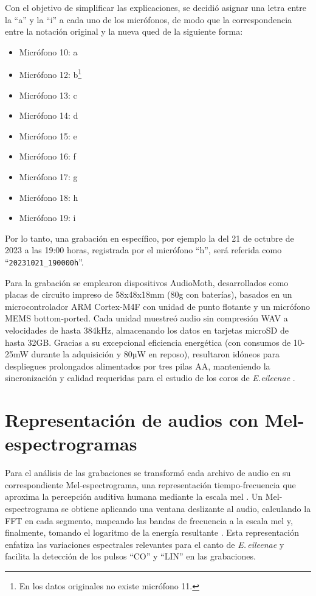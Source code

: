 Con el objetivo de simplificar las explicaciones, se decidió 
asignar una letra entre la “a” y la “i” a cada uno de los micrófonos,
de modo que la correspondencia entre la notación original y la nueva 
qued de la siguiente forma:
\begin{itemize}
    \item Micrófono 10: a
    \item Micrófono 12: b\footnote{En los datos originales no existe micrófono 11.}
    \item Micrófono 13: c
    \item Micrófono 14: d
    \item Micrófono 15: e
    \item Micrófono 16: f
    \item Micrófono 17: g
    \item Micrófono 18: h
    \item Micrófono 19: i
\end{itemize}

Por lo tanto, una grabación en específico, por ejemplo la del 21 de octubre de 2023 a las 
19:00 horas, registrada por el micrófono “h”, será referida como “\texttt{20231021\_190000h}”.

Para la grabación se emplearon dispositivos AudioMoth, 
desarrollados como placas de circuito impreso de 58x48x18mm 
(80g con baterías), basados en un microcontrolador ARM 
Cortex-M4F con unidad de punto flotante y un micrófono MEMS 
bottom-ported. Cada unidad muestreó audio sin compresión WAV a 
velocidades de hasta 384kHz, almacenando los datos en tarjetas 
microSD de hasta 32GB. Gracias a su excepcional eficiencia 
energética (con consumos de 10-25mW durante la adquisición y 
80µW en reposo), 
resultaron idóneos para despliegues prolongados alimentados por 
tres pilas AA, manteniendo la sincronización y calidad 
requeridas para el estudio de los coros de \emph{E.eileenae} \cite{hill2018audiomoth}.


\section{Representación de audios con Mel-espectrogramas}
\label{sec:mel_spectrogramas}

Para el análisis de las grabaciones se transformó cada archivo 
de audio en su correspondiente Mel-espectrograma, una 
representación tiempo-frecuencia que aproxima la percepción 
auditiva humana mediante la escala mel \cite{zhang2021acoustic}. 
Un Mel-espectrograma se obtiene aplicando una ventana 
deslizante al audio, calculando la FFT en cada segmento, mapeando las bandas de 
frecuencia a la escala mel y, finalmente, tomando el logaritmo 
de la energía resultante \cite{zhang2021acoustic}. Esta 
representación enfatiza las variaciones espectrales relevantes 
para el canto de \emph{E.\,eileenae} y facilita la detección de 
los pulsos “CO” y “LIN” en las grabaciones.

